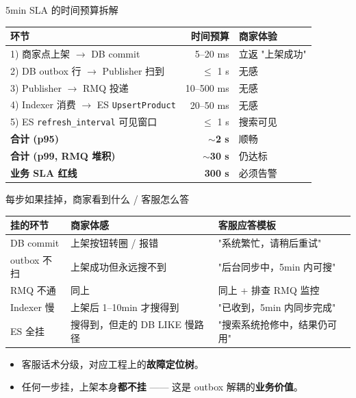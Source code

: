 \documentclass[aspectratio=169,11pt]{beamer}
\begin{document}
\begin{frame}[shrink]{5min SLA 的时间预算拆解}
\begin{tabular}{@{}lrl@{}}
\toprule
环节                                   & 时间预算    & 商家体验      \\
\midrule
1) 商家点上架 $\to$ DB commit          & 5--20 ms    & 立返 "上架成功" \\
2) DB outbox 行 $\to$ Publisher 扫到   & $\le$ 1 s   & 无感         \\
3) Publisher $\to$ RMQ 投递            & 10--500 ms  & 无感         \\
4) Indexer 消费 $\to$ ES \texttt{UpsertProduct} & 20--50 ms   & 无感         \\
5) ES \texttt{refresh\_interval} 可见窗口 & $\le$ 1 s   & 搜索可见     \\
\midrule
\textbf{合计 (p95)}                    & \textbf{$\sim$2 s} & 顺畅         \\
\textbf{合计 (p99, RMQ 堆积)}          & \textbf{$\sim$30 s} & 仍达标       \\
\textbf{业务 SLA 红线}                 & \textbf{300 s} & 必须告警     \\
\bottomrule
\end{tabular}
\vspace{1mm}
\end{frame}

\begin{frame}[shrink]{每步如果挂掉，商家看到什么 / 客服怎么答}
\begin{tabular}{@{}lll@{}}
\toprule
挂的环节       & 商家体感                        & 客服应答模板                    \\
\midrule
DB commit      & 上架按钮转圈 / 报错              & "系统繁忙，请稍后重试"          \\
outbox 不扫    & 上架成功但永远搜不到             & "后台同步中，5min 内可搜"       \\
RMQ 不通       & 同上                            & 同上 + 排查 RMQ 监控            \\
Indexer 慢     & 上架后 1--10min 才搜得到         & "已收到，5min 内同步完成"        \\
ES 全挂        & 搜得到，但走的 DB LIKE 慢路径    & "搜索系统抢修中，结果仍可用"     \\
\bottomrule
\end{tabular}
\vspace{2mm}
\begin{itemize}
  \item 客服话术分级，对应工程上的\textbf{故障定位树}。
  \item 任何一步挂，上架本身\textbf{都不挂} —— 这是 outbox 解耦的\textbf{业务价值}。
\end{itemize}
\end{frame}
\end{document}
